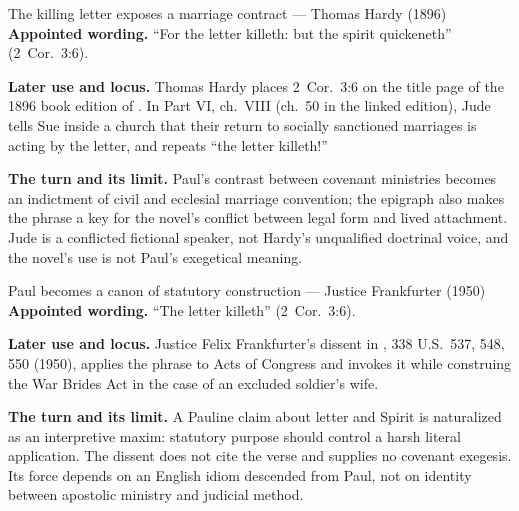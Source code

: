 \begin{afterlife}{The killing letter exposes a marriage contract --- Thomas Hardy (1896)}
\textbf{Appointed wording.} ``For the letter killeth: but the spirit
quickeneth'' (2~Cor.~3:6).

\textbf{Later use and locus.} Thomas Hardy places 2~Cor.~3:6 on the title page
of the 1896 book edition of . In Part VI, ch.~VIII
(ch.~50 in the linked edition), Jude tells Sue inside a church that their
return to socially sanctioned marriages is acting by the letter, and repeats
``the letter killeth!''

\textbf{The turn and its limit.} Paul's contrast between covenant ministries
becomes an indictment of civil and ecclesial marriage convention; the epigraph
also makes the phrase a key for the novel's conflict between legal form and
lived attachment. Jude is a conflicted fictional speaker, not Hardy's
unqualified doctrinal voice, and the novel's use is not Paul's exegetical
meaning.
\end{afterlife}

\begin{afterlife}{Paul becomes a canon of statutory construction --- Justice Frankfurter (1950)}
\textbf{Appointed wording.} ``The letter killeth'' (2~Cor.~3:6).

\textbf{Later use and locus.} Justice Felix Frankfurter's dissent in
, 338 U.S.~537, 548, 550
(1950), applies the phrase to Acts of Congress and invokes it while construing
the War Brides Act in the case of an excluded soldier's wife.

\textbf{The turn and its limit.} A Pauline claim about letter and Spirit is
naturalized as an interpretive maxim: statutory purpose should control a harsh
literal application. The dissent does not cite the verse and supplies no
covenant exegesis. Its force depends on an English idiom descended from Paul,
not on identity between apostolic ministry and judicial method.
\end{afterlife}
